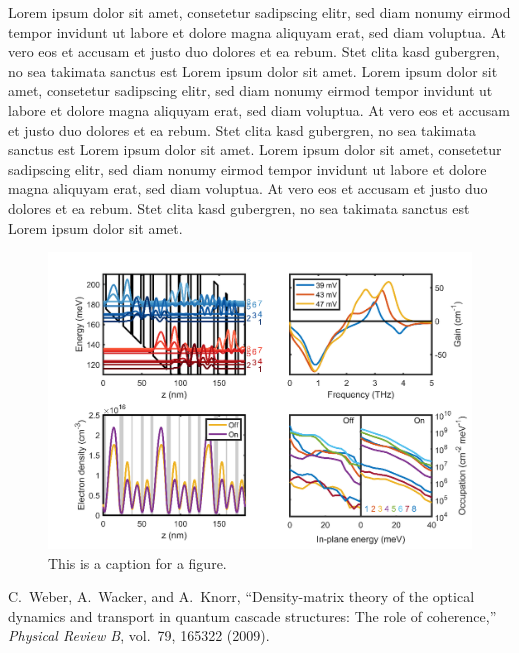 \documentclass{itqwconf}
\begin{document}
Lorem ipsum dolor sit amet, consetetur sadipscing elitr, sed diam nonumy
eirmod tempor invidunt ut labore et dolore magna aliquyam erat, sed diam
voluptua. At vero eos et accusam et justo duo dolores et ea rebum. Stet clita
kasd gubergren, no sea takimata sanctus est Lorem ipsum dolor sit amet. Lorem
ipsum dolor sit amet, consetetur sadipscing elitr, sed diam nonumy eirmod
tempor invidunt ut labore et dolore magna aliquyam erat, sed diam voluptua.
At vero eos et accusam et justo duo dolores et ea rebum. Stet clita kasd
gubergren, no sea takimata sanctus est Lorem ipsum dolor sit amet. Lorem
ipsum dolor sit amet, consetetur sadipscing elitr, sed diam nonumy eirmod
tempor invidunt ut labore et dolore magna aliquyam erat, sed diam voluptua.
At vero eos et accusam et justo duo dolores et ea rebum. Stet clita kasd
gubergren, no sea takimata sanctus est Lorem ipsum dolor sit amet.

\begin{figure}[h!]
  \centering
  \includegraphics[width=11.96cm]{sample.png}
  \caption{This is a caption for a figure.}
\end{figure}

\begin{thebibliography}{1}
  \newcommand{\enquote}[1]{``#1''}

  C.~Weber, A.~Wacker, and A.~Knorr, ``Density-matrix theory of the optical
  dynamics and transport in quantum cascade structures: The role of
  coherence,'' \emph{Physical Review B}, vol.~79, 165322 (2009).
\end{thebibliography}
\end{document}
